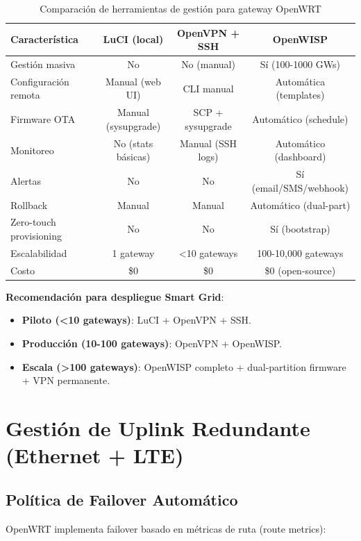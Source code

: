 \begin{table}[h]
\centering
\small
\begin{tabular}{|l|c|c|c|}
\hline
\textbf{Característica} & \textbf{LuCI (local)} & \textbf{OpenVPN + SSH} & \textbf{OpenWISP} \\
\hline
Gestión masiva & No & No (manual) & Sí (100-1000 GWs) \\
Configuración remota & Manual (web UI) & CLI manual & Automática (templates) \\
Firmware OTA & Manual (sysupgrade) & SCP + sysupgrade & Automático (schedule) \\
Monitoreo & No (stats básicas) & Manual (SSH logs) & Automático (dashboard) \\
Alertas & No & No & Sí (email/SMS/webhook) \\
Rollback & Manual & Manual & Automático (dual-part) \\
Zero-touch provisioning & No & No & Sí (bootstrap) \\
Escalabilidad & 1 gateway & <10 gateways & 100-10,000 gateways \\
Costo & \$0 & \$0 & \$0 (open-source) \\
\hline
\end{tabular}
\caption{Comparación de herramientas de gestión para gateway OpenWRT}
\end{table}

\textbf{Recomendación para despliegue Smart Grid}:
\begin{itemize}
    \item \textbf{Piloto (<10 gateways)}: LuCI + OpenVPN + SSH.
    \item \textbf{Producción (10-100 gateways)}: OpenVPN + OpenWISP.
    \item \textbf{Escala (>100 gateways)}: OpenWISP completo + dual-partition firmware + VPN permanente.
\end{itemize}

\section{Gestión de Uplink Redundante (Ethernet + LTE)}

\subsection{Política de Failover Automático}

OpenWRT implementa failover basado en métricas de ruta (route metrics):

